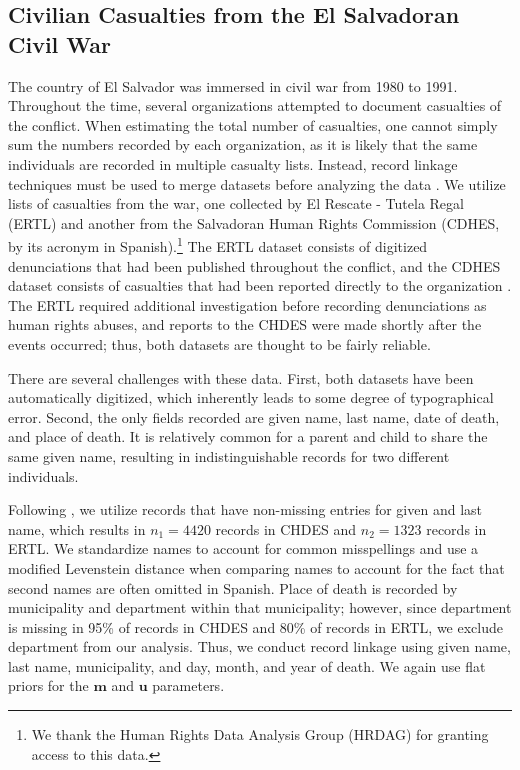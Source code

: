 \documentclass[ba]{imsart}
\begin{document}
	\subsection{Civilian Casualties from the El Salvadoran Civil War}
	\label{el_salvador}
	
	The country of El Salvador was immersed in civil war from 1980 to 1991. Throughout the time, several organizations attempted to document casualties of the conflict. When estimating the total number of casualties, one cannot simply sum the numbers recorded by each organization, as it is likely that the same individuals are recorded in multiple casualty lists. Instead, record linkage techniques must be used to merge datasets before analyzing the data \citep{lum2013applications}. We utilize lists of casualties from the war, one collected by El Rescate - Tutela Regal (ERTL) and another from the Salvadoran Human Rights Commission (CDHES, by its acronym in Spanish).\footnote{We thank the Human Rights Data Analysis Group (HRDAG) for granting access to this data.} The ERTL dataset consists of digitized denunciations that had been published throughout the conflict, and the CDHES dataset consists of casualties that had been reported directly to the organization \citep{howland2008rescate, ball2000salvadoran}. The ERTL required additional investigation before recording denunciations as human rights abuses, and reports to the CHDES were made shortly after the events occurred; thus, both datasets are thought to be fairly reliable.
	
	There are several challenges with these data. First, both datasets have been automatically digitized, which inherently leads to some degree of typographical error. Second, the only fields recorded are given name, last name, date of death, and place of death. It is relatively common for a parent and child to share the same given name, resulting in indistinguishable records for two different individuals. 
	
	
	Following \cite{sadinle_bayesian_2017}, we utilize records that have non-missing entries for given and last name, which results in \(n_1 = 4420\) records in CHDES and \(n_2 = 1323\) records in ERTL. We standardize names to account for common misspellings and use a modified Levenstein distance when comparing names to account for the fact that second names are often omitted in Spanish. Place of death is recorded by municipality and department within that municipality; however, since department is missing in 95\% of records in CHDES and 80\% of records in ERTL, we exclude department from our analysis. Thus, we conduct record linkage using given name, last name, municipality, and day, month, and year of death. We again use flat priors for the \(\bm{m}\) and \(\bm{u}\) parameters.
	
\end{document}
